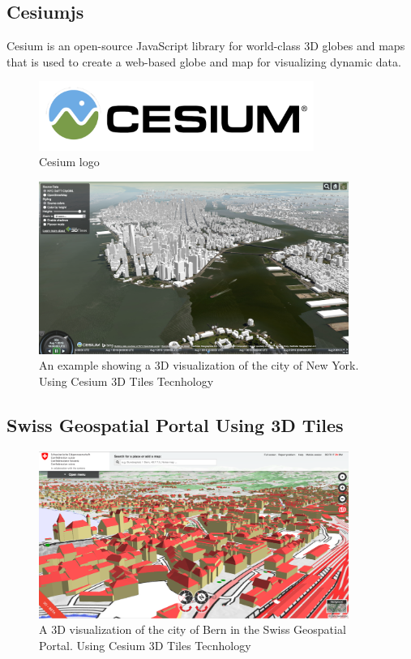 \documentclass[]{usiinfbachelorproject}
\begin{document}
\subsection{Cesiumjs}
Cesium is an open-source JavaScript library for world-class 3D globes and maps that is used to create a web-based globe and map for visualizing dynamic data. 
\begin{figure} [H]
\centering
\includegraphics[width=0.8\textwidth]{images/cesium_logo}
\caption{Cesium logo}
\label{fig:cesium_logo}
\end{figure}
\begin{figure} [H]
\centering
\includegraphics[width=0.9\textwidth]{images/NewYorkCityCesium3dTiles}
\caption{An example showing a 3D visualization of the city of New York. Using Cesium 3D Tiles Tecnhology}
\label{fig:NewYorkCityCesium3dTiles}
\end{figure}
\subsection{Swiss Geospatial Portal Using 3D Tiles}
\begin{figure} [H]
\centering
\includegraphics[width=0.9\textwidth]{images/BernCitySwissTopo}
\caption{A 3D visualization of the city of Bern in the Swiss Geospatial Portal. Using Cesium 3D Tiles Tecnhology}
\label{fig:BernCitySwissTopo}
\end{figure}
\end{document}
